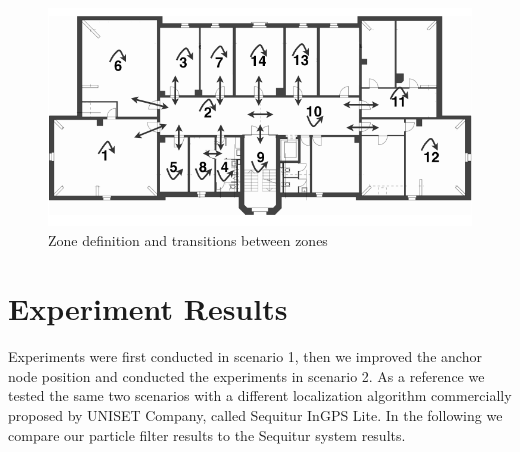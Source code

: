 \begin{figure}[th]
\centering
\includegraphics[width=1.0\textwidth]{Figures/zone_definition}
\decoRule
\caption[Zone Definition]{Zone definition and transitions between zones}
\label{fig:zone_definition}
\end{figure}

\section{Experiment Results}
Experiments were first conducted in scenario 1, then we improved the anchor node position and conducted the experiments in scenario 2. As a reference we tested the same two scenarios with a different localization algorithm commercially proposed by UNISET Company, called Sequitur InGPS Lite. In the following we compare our particle filter results to the Sequitur system results.
